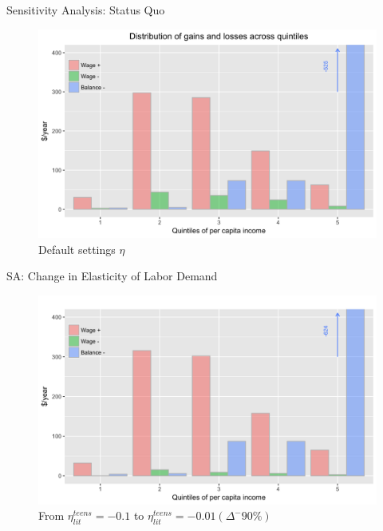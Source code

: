 \documentclass{beamer}
\def\white{\color{white}}
\begin{document}
\begin{frame}[noframenumbering]{Sensitivity Analysis: Status Quo}
\begin{figure}[h!]
\centering
\hspace*{-3em}
\includegraphics[scale = 0.17]{../Images/policy_est}
\caption{Default settings {\white $ \eta $} }
\end{figure}	
\end{frame}

\begin{frame}{SA: Change in Elasticity of Labor Demand}
\begin{figure}[h!]
\centering
\hspace*{-3em}
\includegraphics[scale = 0.17]{../Images/policy_est_eta001}
\caption{From $\eta^{teens}_{lit} = - 0.1$ to  $\eta^{teens}_{lit} = - 0.01(\Delta^{-}90\%)$}
\end{figure}	
\end{frame}
\end{document}
